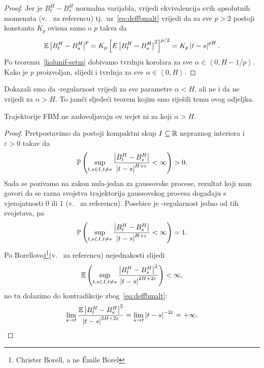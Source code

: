 \documentclass[main.tex]{subfiles}
\begin{document}
\begin{proof}
	Jer je \( B^H_t-B^H_s \) normalna varijabla, vrijedi ekvivalencija svih
	apsolutnih momenata (v.~\cite[str.~16]{ayache} za referencu) tj.\
	uz~\eqref{eq:deffbmalt} vrijedi da
	za sve \( p > 2 \) postoji konstanta \( K_p \) ovisna samo o \( p \) takva da
	\begin{equation}
		\mathbb{E} \left| {B^H_t-B^H_s} \right|^p = K_p \left[ E \left| {B^H_t-B^H_s} \right|^2 \right] ^{p/2} = K_p \left| {t-s} \right|^{pH}.
	\end{equation}
	Po teoremu~\ref{holunif-setm} dobivamo tvrdnju korolara
	za sve \( \alpha \in \left\langle 0,H-1/p  \right\rangle  \). Kako je \( p \)
	proizvoljan, slijedi i tvrdnja za sve \( \alpha \in \left\langle 0,H \right\rangle \).
\end{proof}

Dokazali smo da \holder -regularnost vrijedi za sve parametre \( \alpha < H \),
ali ne i da ne vrijedi za \( \alpha > H \). To jamči sljedeći teorem
kojim smo riješili temu ovog odjeljka.

\begin{teorem}\label{holunif-prop>}
	Trajektorije FBM ne zadovoljavaju \holder ov uvjet ni za koji \( \alpha > H \).
\end{teorem}

\begin{proof}
	Pretpostavimo da postoji kompaktni skup \( I \subseteq \mathbb{R} \)
	nepraznog interiora i \( \varepsilon > 0 \) takav da
	\begin{equation}
		\mathbb{P}\left( \sup\limits_{t,s \in I, t\neq s} \frac{\left| {B^H_t-B^H_s} \right|}{\left| {t-s} \right|^{H+\varepsilon}} < \infty \right) > 0.
	\end{equation}
	Sada se pozivamo na zakon nula-jedan za gaussovske procese, rezultat koji nam govori da se razna svojstva
	trajektorija gaussovskog procesa događaju s vjerojatnosti \( 0 \) ili \( 1 \) (v.~\cite[prop.~3.7]{ayache} za referencu).
	Posebice je \holder -regularnost jedno od tih svojstava, pa
	\begin{equation}
		\mathbb{P} \left( \sup\limits_{t,s \in I, t\neq s} \frac{\left| {B^H_t-B^H_s} \right|}{\left| {t-s} \right|^{H+\varepsilon}} < \infty  \right) = 1.
	\end{equation}
	Po Borellovoj\footnote{Christer Borell, a ne \'Emile Borel}(v.~\cite[prop.~3.7]{ayache} za referencu) nejednakosti slijedi
	\begin{equation}
		\mathbb{E} \left( \sup_{t,s \in I, t\neq s} \frac{\left| {B^H_t-B^H_s} \right|^2}{\left| {t-s} \right|^{2H+2\varepsilon}} \right) < \infty,
	\end{equation}
	no tu dolazimo do kontradikcije zbog~\eqref{eq:deffbmalt}:
	\begin{equation}
		\lim_{s \rightarrow t} \frac{\mathbb{E} \left| {B^H_t-B^H_s} \right|^2}{\left| {t-s} \right|^{2H+2\varepsilon}} = \lim_{s \rightarrow t} \left| {t-s} \right|^{-2\varepsilon} = +\infty.
	\end{equation}
\end{proof}
\end{document}
